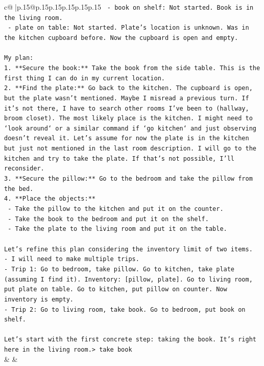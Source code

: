 \documentclass{article}
\begin{document}
{\begin{supertabular}{c@{$\;$}|p{.15\linewidth}@{}p{.15\linewidth}p{.15\linewidth}p{.15\linewidth}p{.15\linewidth}p{.15\linewidth}}
{{{\texttt{    {-} book on shelf: Not started. Book is in the living room.} \\
\texttt{    {-} plate on table: Not started. Plate's location is unknown. Was in the kitchen cupboard before. Now the cupboard is open and empty.} \\
\\ 
\texttt{My plan:} \\
\texttt{1.  **Secure the book:** Take the book from the side table. This is the first thing I can do in my current location.} \\
\texttt{2.  **Find the plate:** Go back to the kitchen. The cupboard is open, but the plate wasn't mentioned. Maybe I misread a previous turn. If it's not there, I have to search other rooms I've been to (hallway, broom closet). The most likely place is the kitchen. I might need to `look around` or a similar command if `go kitchen` and just observing doesn't reveal it. Let's assume for now the plate is in the kitchen but just not mentioned in the last room description. I will go to the kitchen and try to take the plate. If that's not possible, I'll reconsider.} \\
\texttt{3.  **Secure the pillow:** Go to the bedroom and take the pillow from the bed.} \\
\texttt{4.  **Place the objects:**} \\
\texttt{    {-}   Take the pillow to the kitchen and put it on the counter.} \\
\texttt{    {-}   Take the book to the bedroom and put it on the shelf.} \\
\texttt{    {-}   Take the plate to the living room and put it on the table.} \\
\\ 
\texttt{Let's refine this plan considering the inventory limit of two items.} \\
\texttt{{-} I will need to make multiple trips.} \\
\texttt{{-} Trip 1: Go to bedroom, take pillow. Go to kitchen, take plate (assuming I find it). Inventory: {[}pillow, plate{]}. Go to living room, put plate on table. Go to kitchen, put pillow on counter. Now inventory is empty.} \\
\texttt{{-} Trip 2: Go to living room, take book. Go to bedroom, put book on shelf.} \\
\\ 
\texttt{Let's start with the first concrete step: taking the book. It's right here in the living room.> take book} \\
            }
        }
    }
    & & \\ \\


\end{supertabular}}
\end{document}
